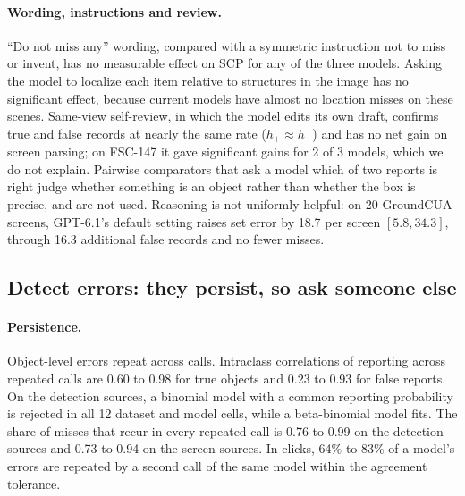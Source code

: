 \paragraph{Wording, instructions and review.} ``Do not miss any'' wording, compared with a symmetric instruction not to miss or invent, has no measurable effect on SCP for any of the three models. Asking the model to localize each item relative to structures in the image has no significant effect, because current models have almost no location misses on these scenes. Same-view self-review, in which the model edits its own draft, confirms true and false records at nearly the same rate ($h_+\approx h_-$) and has no net gain on screen parsing; on FSC-147 it gave significant gains for 2 of 3 models, which we do not explain. Pairwise comparators that ask a model which of two reports is right judge whether something is an object rather than whether the box is precise, and are not used. Reasoning is not uniformly helpful: on 20 GroundCUA screens, GPT-6.1's default setting raises set error by 18.7 per screen $[5.8,34.3]$, through 16.3 additional false records and no fewer misses.

\subsection{Detect errors: they persist, so ask someone else}\label{sec:res:persist}

\paragraph{Persistence.} Object-level errors repeat across calls. Intraclass correlations of reporting across repeated calls are 0.60 to 0.98 for true objects and 0.23 to 0.93 for false reports. On the detection sources, a binomial model with a common reporting probability is rejected in all 12 dataset and model cells, while a beta-binomial model fits. The share of misses that recur in every repeated call is 0.76 to 0.99 on the detection sources and 0.73 to 0.94 on the screen sources. In clicks, 64\% to 83\% of a model's errors are repeated by a second call of the same model within the agreement tolerance.

